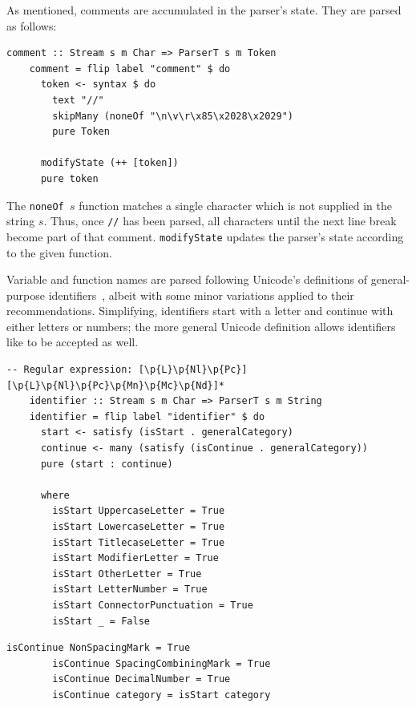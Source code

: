 \documentclass[UdineBachThesis,american,11pt]{PhdThesis}
\begin{document}
  As mentioned, comments are accumulated in the parser's state. They are parsed
  as follows:

  \begin{Verbatim}[gobble=4,fontsize=\small]
    comment :: Stream s m Char => ParserT s m Token
    comment = flip label "comment" $ do
      token <- syntax $ do
        text "//"
        skipMany (noneOf "\n\v\r\x85\x2028\x2029")
        pure Token

      modifyState (++ [token])
      pure token
  \end{Verbatim}

  The \mbox{\texttt{noneOf $s$}} function matches a single character which is
  not supplied in the string $s$. Thus, once \mbox{\texttt{//}} has been parsed,
  all characters until the next line break become part of that comment.
  \mbox{\texttt{modifyState}} updates the parser's state according to the given
  function.

  Variable and function names are parsed following Unicode's definitions of
  general-purpose identifiers~\cite{identifier-syntax}, albeit with some minor
  variations applied to their recommendations. Simplifying, identifiers start
  with a letter and continue with either letters or numbers; the more general
  Unicode definition allows identifiers like
  \mbox{\texttt{}} to be accepted as well.

  \begin{Verbatim}[gobble=4,fontsize=\small]
    -- Regular expression: [\p{L}\p{Nl}\p{Pc}][\p{L}\p{Nl}\p{Pc}\p{Mn}\p{Mc}\p{Nd}]*
    identifier :: Stream s m Char => ParserT s m String
    identifier = flip label "identifier" $ do
      start <- satisfy (isStart . generalCategory)
      continue <- many (satisfy (isContinue . generalCategory))
      pure (start : continue)

      where
        isStart UppercaseLetter = True
        isStart LowercaseLetter = True
        isStart TitlecaseLetter = True
        isStart ModifierLetter = True
        isStart OtherLetter = True
        isStart LetterNumber = True
        isStart ConnectorPunctuation = True
        isStart _ = False
  \end{Verbatim}

  \pagebreak

  \begin{Verbatim}[gobble=4,fontsize=\small]
        isContinue NonSpacingMark = True
        isContinue SpacingCombiningMark = True
        isContinue DecimalNumber = True
        isContinue category = isStart category
  \end{Verbatim}
\end{document}
